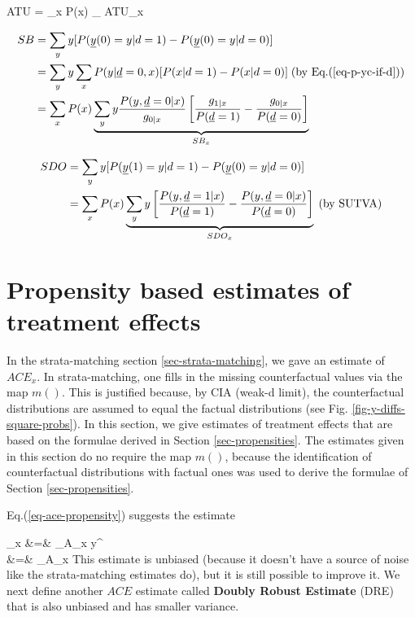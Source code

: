 \beq
ATU
=
\sum_x P(x)
_
{ATU_x}
\eeq

\begin{align}
SB&= \sum_y y
[P(\rvy(0)=y|d=1)-P(\rvy(0)=y|d=0)]
\\
&=
\sum_y y
\sum_x P(y| \rvd=0,x)
[
P(x|d=1)-P(x|d=0)]
\;\text{(by Eq.(\ref{eq-p-yc-if-d}))}
\\
&=
\sum_x P(x)
\underbrace{\sum_y y
\frac{P(y, \rvd=0|x)}{g_{0|x}}
\left[
\frac{g_{1|x}}{P(\rvd=1)}
-
\frac{g_{0|x}}{P(\rvd=0)}
\right]}_{SB_x}
\end{align}

\begin{align}
SDO
&=
\sum_y y
[P(\rvy(1)=y|d=1)-P(\rvy(0)=y|d=0)]
\\
&=
\sum_x P(x)
\underbrace{\sum_y y
\left[
\frac{P(y, \rvd=1|x)}{P(\rvd=1)}
-
\frac{P(y, \rvd=0|x)}{P(\rvd=0)}
\right]}_{SDO_x}
\;\text{(by SUTVA)}
\end{align}

\section{Propensity based  estimates of
treatment effects}

In the  strata-matching
section \ref{sec-strata-matching}, we gave an estimate
of $ACE_x$.
In strata-matching, one
fills in the missing
counterfactual values
via the map $m()$.
This is justified
because,
by CIA (weak-d limit),
the counterfactual
distributions
are assumed to equal
the factual distributions (see Fig.
\ref{fig-y-diffs-square-probs}).
In this
section,
we give estimates
of treatment effects that
are based on the  formulae derived
in Section \ref{sec-propensities}.
The estimates given in this section
do no require
the map $m()$, because
the identification of
counterfactual distributions
with factual ones was used to
derive the formulae
of  Section \ref{sec-propensities}.




Eq.(\ref{eq-ace-propensity})
 suggests the estimate

\beqa
{}_x
&=&
\sum_{\s\in A_x}
y^\s
{}
\\
&=&
\sum_{\s \in A_x}
\label{eq-ace-esti-posi}
\eeqa
This
estimate is unbiased
(because it doesn't
have a source
of noise like the
strata-matching
estimates do),
but it is still possible to
improve it.
We next
define
another $ACE$ estimate
called
{\bf Doubly Robust Estimate} (DRE)
that is also
unbiased and has smaller
variance.

